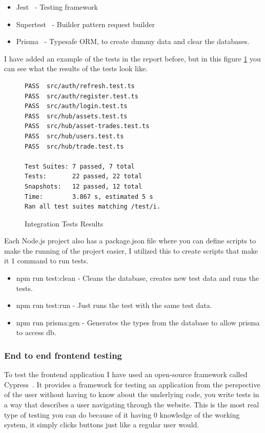 \documentclass[titlepage]{article}
\begin{document}
\begin{itemize}
  \item Jest~\cite{jest} - Testing framework
  \item Supertest~\cite{supertest} - Builder pattern request builder
  \item Prisma~\cite{prisma} - Typesafe ORM, to create dummy data and clear the databases.
\end{itemize}

I have added an example of the tests in the report before, but in this figure \ref{integration} you can see what the results of the tests look like.

\begin{figure}[h]
  \begin{verbatim}
PASS  src/auth/refresh.test.ts
PASS  src/auth/register.test.ts
PASS  src/auth/login.test.ts
PASS  src/hub/assets.test.ts
PASS  src/hub/asset-trades.test.ts
PASS  src/hub/users.test.ts
PASS  src/hub/trade.test.ts

Test Suites: 7 passed, 7 total
Tests:       22 passed, 22 total
Snapshots:   12 passed, 12 total
Time:        3.867 s, estimated 5 s
Ran all test suites matching /test/i.
  \end{verbatim}
  \caption{Integration Tests Results}
  \label{integration}
\end{figure}

Each Node.js project also has a package.json file where you can define scripts to make the running of the project easier, I utilized this to create scripts that make it 1 command to run tests.

\begin{itemize}
  \item npm run test:clean - Cleans the database, creates new test data and runs the tests.
  \item npm run test:run - Just runs the test with the same test data.
  \item npm run prisma:gen - Generates the types from the database to allow prisma to access db.
\end{itemize}

\subsubsection{End to end frontend testing}
To test the frontend application I have used an open-source framework called Cypress~\cite{cypress}. It provides a framework for testing an application from the perspective of the user without having to know about the underlying code, you write tests in a way that describes a user navigating through the website. This is the most real type of testing you can do because of it having 0 knowledge of the working system, it simply clicks buttons just like a regular user would. \\
\end{document}
